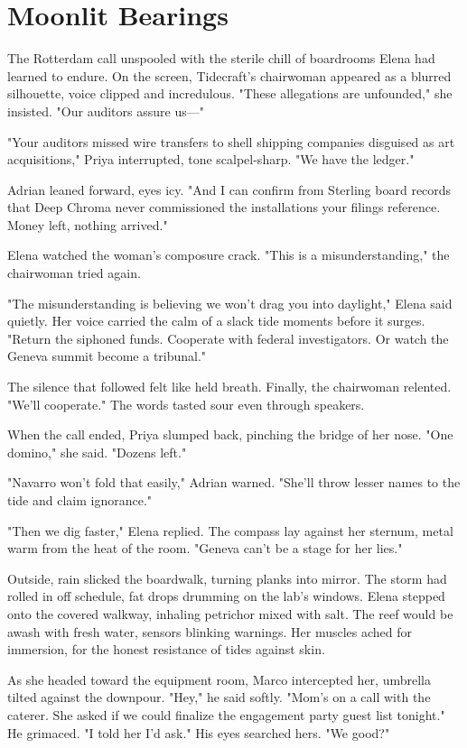 \chapter{Moonlit Bearings}

The Rotterdam call unspooled with the sterile chill of boardrooms Elena had learned to endure. On the screen, Tidecraft's chairwoman appeared as a blurred silhouette, voice clipped and incredulous. "These allegations are unfounded," she insisted. "Our auditors assure us—"

"Your auditors missed wire transfers to shell shipping companies disguised as art acquisitions," Priya interrupted, tone scalpel-sharp. "We have the ledger."

Adrian leaned forward, eyes icy. "And I can confirm from Sterling board records that Deep Chroma never commissioned the installations your filings reference. Money left, nothing arrived."

Elena watched the woman's composure crack. "This is a misunderstanding," the chairwoman tried again.

"The misunderstanding is believing we won't drag you into daylight," Elena said quietly. Her voice carried the calm of a slack tide moments before it surges. "Return the siphoned funds. Cooperate with federal investigators. Or watch the Geneva summit become a tribunal."

The silence that followed felt like held breath. Finally, the chairwoman relented. "We'll cooperate." The words tasted sour even through speakers.

When the call ended, Priya slumped back, pinching the bridge of her nose. "One domino," she said. "Dozens left."

"Navarro won't fold that easily," Adrian warned. "She'll throw lesser names to the tide and claim ignorance."

"Then we dig faster," Elena replied. The compass lay against her sternum, metal warm from the heat of the room. "Geneva can't be a stage for her lies."

Outside, rain slicked the boardwalk, turning planks into mirror. The storm had rolled in off schedule, fat drops drumming on the lab's windows. Elena stepped onto the covered walkway, inhaling petrichor mixed with salt. The reef would be awash with fresh water, sensors blinking warnings. Her muscles ached for immersion, for the honest resistance of tides against skin.

As she headed toward the equipment room, Marco intercepted her, umbrella tilted against the downpour. "Hey," he said softly. "Mom's on a call with the caterer. She asked if we could finalize the engagement party guest list tonight." He grimaced. "I told her I'd ask." His eyes searched hers. "We good?"

